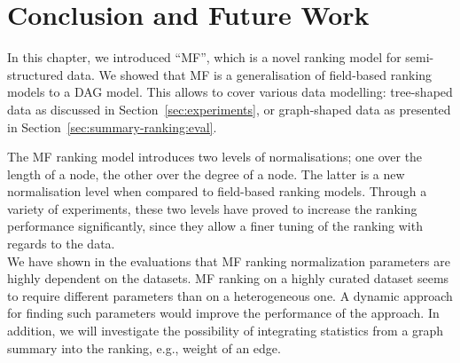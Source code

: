 \section{Conclusion and Future Work}

In this chapter, we introduced ``MF'', which is a novel ranking model for semi-structured data. We showed that MF is a generalisation of field-based ranking models to a DAG model. This allows to cover various data modelling: tree-shaped data as discussed in Section~\ref{sec:experiments}, or graph-shaped data as presented in Section~\ref{sec:summary-ranking:eval}.

The MF ranking model introduces two levels of normalisations; one over the length of a node, the other over the degree of a node. The latter is a new normalisation level when compared to field-based ranking models. Through a variety of experiments, these two levels have proved to increase the ranking performance significantly, since they allow a finer tuning of the ranking with regards to the data.\\

We have shown in the evaluations that MF ranking normalization parameters are highly dependent on the datasets. MF ranking on a highly curated dataset seems to require different parameters than on a heterogeneous one. A dynamic approach for finding such parameters would improve the performance of the approach. In addition, we will investigate the possibility of integrating statistics from a graph summary into the ranking, e.g., weight of an edge.
